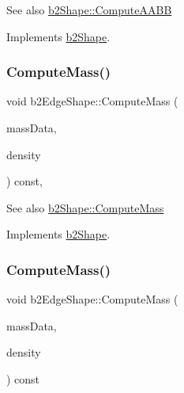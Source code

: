 \begin{DoxySeeAlso}{See also}
\hyperlink{classb2Shape_a88e9807fab0c8ca9a98d8926e50a1411}{b2\+Shape\+::\+Compute\+A\+A\+BB} 
\end{DoxySeeAlso}


Implements \hyperlink{classb2Shape_a88e9807fab0c8ca9a98d8926e50a1411}{b2\+Shape}.

\mbox{\label{classb2EdgeShape_ac738c1e0ab2f4dfbab26e3942efa60af}} 
\subsubsection{\texorpdfstring{Compute\+Mass()}{ComputeMass()}\hspace{0.1cm}{\footnotesize\ttfamily [1/2]}}
{\footnotesize\ttfamily void b2\+Edge\+Shape\+::\+Compute\+Mass (\begin{DoxyParamCaption}\item[{\hyperlink{structb2MassData}{b2\+Mass\+Data} $\ast$}]{mass\+Data,  }\item[{float32}]{density }\end{DoxyParamCaption}) const\hspace{0.3cm}{\ttfamily [override]}, {\ttfamily [virtual]}}

\begin{DoxySeeAlso}{See also}
\hyperlink{classb2Shape_a61b365526241b47f124789b0309cac69}{b2\+Shape\+::\+Compute\+Mass} 
\end{DoxySeeAlso}


Implements \hyperlink{classb2Shape_a61b365526241b47f124789b0309cac69}{b2\+Shape}.

\mbox{\label{classb2EdgeShape_a1cd695882766566f76bb0fedf346407d}} 
\subsubsection{\texorpdfstring{Compute\+Mass()}{ComputeMass()}\hspace{0.1cm}{\footnotesize\ttfamily [2/2]}}
{\footnotesize\ttfamily void b2\+Edge\+Shape\+::\+Compute\+Mass (\begin{DoxyParamCaption}\item[{\hyperlink{structb2MassData}{b2\+Mass\+Data} $\ast$}]{mass\+Data,  }\item[{float32}]{density }\end{DoxyParamCaption}) const\hspace{0.3cm}{\ttfamily [virtual]}}

